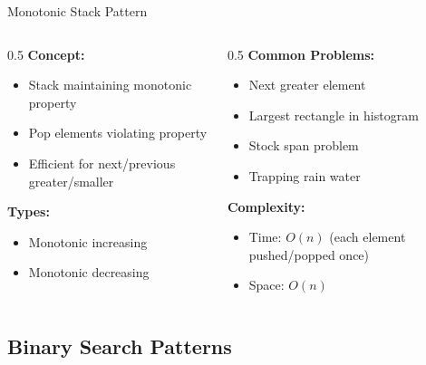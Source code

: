 \documentclass[aspectratio=169,xcolor=dvipsnames]{beamer}
\begin{document}
\begin{frame}{Monotonic Stack Pattern}
  \begin{columns}
    \begin{column}{0.5\textwidth}
      \textbf{Concept:}
      \begin{itemize}
        \item Stack maintaining monotonic property
        \item Pop elements violating property
        \item Efficient for next/previous greater/smaller
      \end{itemize}

      \vspace{0.3cm}
      \textbf{Types:}
      \begin{itemize}
        \item Monotonic increasing
        \item Monotonic decreasing
      \end{itemize}
    \end{column}

    \begin{column}{0.5\textwidth}
      \textbf{Common Problems:}
      \begin{itemize}
        \item Next greater element
        \item Largest rectangle in histogram
        \item Stock span problem
        \item Trapping rain water
      \end{itemize}

      \vspace{0.3cm}
      \textbf{Complexity:}
      \begin{itemize}
        \item Time: $O(n)$ (each element pushed/popped once)
        \item Space: $O(n)$
      \end{itemize}
    \end{column}
  \end{columns}
\end{frame}

\subsection{Binary Search Patterns}
\end{document}
